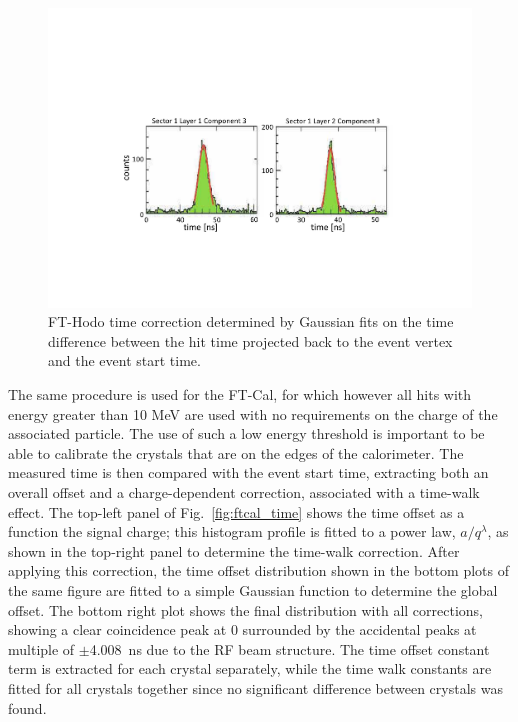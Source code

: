 \begin{figure}
\includegraphics[width=1.0\columnwidth]{fig/fthodo_time.pdf}
\caption{FT-Hodo time correction determined by Gaussian fits on the time difference between the hit time
  projected back to the event vertex and the event start time.}
\label{fig:fthodo_time}
\end{figure}

The same procedure is used for the FT-Cal, for which however all hits with energy greater than 10 MeV are used
with no requirements on the charge of the associated particle. The use of such a low energy threshold is important
to be able to calibrate the crystals that are on the edges of the calorimeter. The measured time is then compared
with the event start time, extracting both an overall offset and a charge-dependent correction, associated with a
time-walk effect. The top-left panel of Fig.~\ref{fig:ftcal_time} shows the time offset as  a function the
signal charge; this histogram profile is fitted to a power law, $a/q^\lambda$, as shown in the top-right panel to
determine the time-walk correction. After applying this correction, the time offset distribution shown in the bottom
plots  of the same figure are fitted to a simple Gaussian function to determine the global offset. The bottom right
plot shows the final distribution with all corrections, showing a clear  coincidence peak at 0 surrounded by the
accidental peaks at multiple of $\pm$4.008~ns  due to the RF beam structure. The time offset constant term is
extracted for each crystal separately, while the time walk constants are fitted for all crystals together since no
significant difference between crystals was found. 

